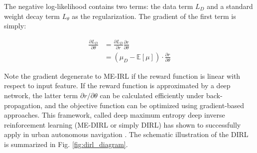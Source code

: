 \documentclass[../thesis.tex]{subfiles}
\begin{document}
The negative log-likelihood contains two terms: the data term $L_{D}$ and a standard weight decay term $L_{\theta}$ as the regularization. 
The gradient of the first term is simply:

\begin{align}
\frac{\partial L_D}{\partial \theta} &= \frac{\partial L_D}{\partial r} \frac{\partial r}{\partial \theta} \\
&= (\mu_D - \mathbb{E}[\mu]) \cdot \frac{\partial r}{\partial \theta} \label{equ:dirl_grad}
\end{align}

Note the gradient degenerate to ME-IRL if the reward function is linear with respect to input feature. 
If the reward function is approximated by a deep network, the latter term $\partial r / \partial \theta$ can be calculated efficiently under back-propagation, and the objective function can be optimized using gradient-based approaches. 
This framework, called deep maximum entropy deep inverse reinforcement learning (ME-DIRL or simply DIRL) has shown to successfully apply in urban autonomous navigation \cite{wulfmeier2016watch}. 
The schematic illustration of the DIRL is summarized in Fig. \ref{fig:dirl_diagram}.


\end{document}
